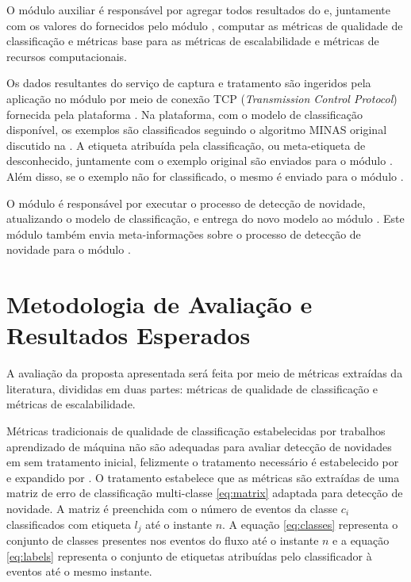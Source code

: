 O módulo auxiliar \sink é responsável por agregar todos resultados do \mfog e,
juntamente com os valores do \dataset fornecidos pelo módulo \source, computar
as métricas de qualidade de classificação e métricas base para as métricas de
escalabilidade e métricas de recursos computacionais.

Os dados resultantes do serviço de captura e tratamento são ingeridos pela
aplicação no módulo \classify por meio de conexão TCP (\emph{Transmission
Control Protocol}) fornecida pela plataforma \flink.
Na plataforma, com o modelo de classificação disponível, os exemplos são
classificados seguindo o algoritmo MINAS original discutido na .
A etiqueta atribuída pela classificação, ou meta-etiqueta de desconhecido,
juntamente com o exemplo original são enviados para o módulo \sink.
Além disso, se o exemplo não for classificado, o mesmo é enviado para o módulo
\detector.

O módulo \detector é responsável por executar o processo de detecção de
novidade, atualizando o modelo de classificação, e entrega do novo modelo
ao módulo \classify.
Este módulo também envia meta-informações sobre o processo de detecção de
novidade para o módulo \sink.



\section{Metodologia de Avaliação e Resultados Esperados}\label{sec:esperados}


A avaliação da proposta apresentada será feita por meio de métricas extraídas da
literatura, divididas em duas partes: métricas de qualidade de classificação
e métricas de escalabilidade.

Métricas tradicionais de qualidade de classificação estabelecidas por trabalhos
aprendizado de máquina não são adequadas para avaliar detecção de novidades em
\streams sem tratamento inicial, felizmente o tratamento necessário é
estabelecido por  e expandido por
.
O tratamento estabelece que as métricas são extraídas de uma matriz de erro de
classificação multi-classe \ref{eq:matrix} adaptada para detecção de novidade.
A matriz é preenchida com o número de eventos da classe $c_i$ classificados com
etiqueta $l_j$ até o instante $n$.
A equação \ref{eq:classes} representa o conjunto de classes presentes nos eventos
do fluxo até o instante $n$ e a equação \ref{eq:labels} representa o conjunto
de etiquetas atribuídas pelo classificador à eventos até o mesmo instante.

